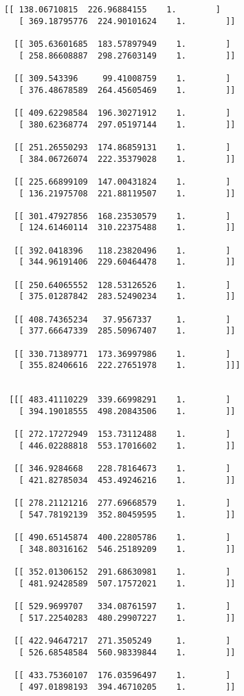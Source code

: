 \documentclass[11pt]{article}
\begin{document}
\begin{Verbatim}[commandchars=\\\{\}]
  [[ 138.06710815  226.96884155    1.        ]
   [ 369.18795776  224.90101624    1.        ]]

  [[ 305.63601685  183.57897949    1.        ]
   [ 258.86608887  298.27603149    1.        ]]

  [[ 309.543396     99.41008759    1.        ]
   [ 376.48678589  264.45605469    1.        ]]

  [[ 409.62298584  196.30271912    1.        ]
   [ 380.62368774  297.05197144    1.        ]]

  [[ 251.26550293  174.86859131    1.        ]
   [ 384.06726074  222.35379028    1.        ]]

  [[ 225.66899109  147.00431824    1.        ]
   [ 136.21975708  221.88119507    1.        ]]

  [[ 301.47927856  168.23530579    1.        ]
   [ 124.61460114  310.22375488    1.        ]]

  [[ 392.0418396   118.23820496    1.        ]
   [ 344.96191406  229.60464478    1.        ]]

  [[ 250.64065552  128.53126526    1.        ]
   [ 375.01287842  283.52490234    1.        ]]

  [[ 408.74365234   37.9567337     1.        ]
   [ 377.66647339  285.50967407    1.        ]]

  [[ 330.71389771  173.36997986    1.        ]
   [ 355.82406616  222.27651978    1.        ]]]


 [[[ 483.41110229  339.66998291    1.        ]
   [ 394.19018555  498.20843506    1.        ]]

  [[ 272.17272949  153.73112488    1.        ]
   [ 446.02288818  553.17016602    1.        ]]

  [[ 346.9284668   228.78164673    1.        ]
   [ 421.82785034  453.49246216    1.        ]]

  [[ 278.21121216  277.69668579    1.        ]
   [ 547.78192139  352.80459595    1.        ]]

  [[ 490.65145874  400.22805786    1.        ]
   [ 348.80316162  546.25189209    1.        ]]

  [[ 352.01306152  291.68630981    1.        ]
   [ 481.92428589  507.17572021    1.        ]]

  [[ 529.9699707   334.08761597    1.        ]
   [ 517.22540283  480.29907227    1.        ]]

  [[ 422.94647217  271.3505249     1.        ]
   [ 526.68548584  560.98339844    1.        ]]

  [[ 433.75360107  176.03596497    1.        ]
   [ 497.01898193  394.46710205    1.        ]]


\end{Verbatim}
\end{document}
